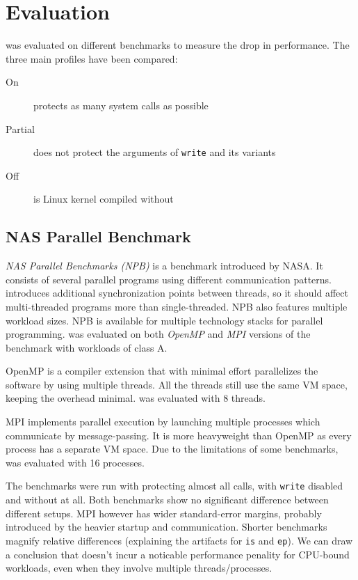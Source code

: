 \section{Evaluation}
\label{sec:evaluation}

\sysname was evaluated on different benchmarks to measure the drop in performance.
The three main profiles have been compared:
\begin{description}
  \item[\sysname On] protects as many system calls as possible
  \item[\sysname Partial] does not protect the arguments of \texttt{write} and its variants
  \item[\sysname Off] is Linux kernel compiled without \sysname  
\end{description}

\subsection{NAS Parallel Benchmark}

\emph{NAS Parallel Benchmarks (NPB)} is a benchmark introduced by NASA. It
consists of several parallel programs using different communication patterns.
\sysname introduces additional synchronization points between threads, so it
should affect multi-threaded programs more than single-threaded. NPB also
features multiple workload sizes. NPB is available for multiple technology
stacks for parallel programming. \sysname was evaluated on both \emph{OpenMP}
and \emph{MPI} versions of the benchmark with workloads of class A.

OpenMP is a compiler extension that with minimal effort parallelizes the software
by using multiple threads. All the threads still use the same VM space, keeping
the overhead minimal. \sysname was evaluated with 8 threads.

MPI implements parallel execution by launching multiple processes which communicate
by message-passing. It is more heavyweight than OpenMP as every process has a
separate VM space. Due to the limitations of some benchmarks, \sysname was 
evaluated with 16 processes.

The benchmarks were run with \sysname protecting almost all calls, with
\texttt{write} disabled and without \sysname at all. Both benchmarks show no
significant difference between different setups. MPI however has wider
standard-error margins, probably introduced by the heavier startup and
communication. Shorter benchmarks magnify relative differences (explaining the
artifacts for \texttt{is} and \texttt{ep}). We can draw a conclusion that \sysname
doesn't incur a noticable performance penality for CPU-bound workloads, even when
they involve multiple threads/processes.

